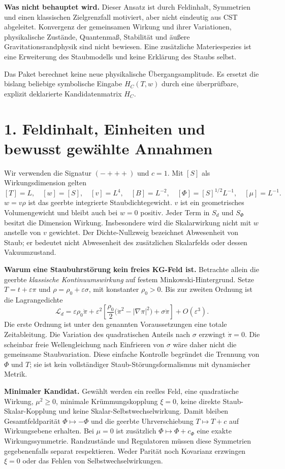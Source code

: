 \documentclass[10pt,a4paper]{article}
\newcommand{\sect}[1]{\section*{\color{navy}#1}}
\begin{document}
\textbf{Was nicht behauptet wird.} Dieser Ansatz ist durch Feldinhalt,
Symmetrien und einen klassischen Zielgrenzfall motiviert, aber nicht
eindeutig aus CST abgeleitet. Konvergenz der gemeinsamen Wirkung und ihrer
Variationen, physikalische Zustände, Quantenmaß, Stabilität und äußere
Gravitationsrandphysik sind nicht bewiesen. Eine zusätzliche Materiespezies
ist eine Erweiterung des Staubmodells und keine Erklärung des Staubs selbst.

Das Paket berechnet keine neue physikalische Übergangsamplitude. Es ersetzt
die bislang beliebige symbolische Eingabe $H_C(T,w)$ durch eine überprüfbare,
explizit deklarierte Kandidatenmatrix $H_C$.

\newpage
\sect{1. Feldinhalt, Einheiten und bewusst gewählte Annahmen}
Wir verwenden die Signatur $(-+++)$ und $c=1$. Mit $[S]$ als
Wirkungsdimension gelten
\[
[T]=L,\quad [w]=[S],\quad [v]=L^4,\quad [B]=L^{-2},
\quad [\Phi]=[S]^{1/2}L^{-1},\quad[\mu]=L^{-1}.
\]
$w=v\rho$ ist das geerbte integrierte Staubdichtegewicht. $v$ ist ein
geometrisches Volumengewicht und bleibt auch bei $w=0$ positiv.
Jeder Term in $S_d$ und $S_\Phi$ besitzt die Dimension Wirkung.
Insbesondere wird die Skalarwirkung nicht mit $w$ anstelle von $v$ gewichtet.
Der Dichte-Nullzweig bezeichnet Abwesenheit von Staub; er bedeutet nicht
Abwesenheit des zusätzlichen Skalarfelds oder dessen Vakuumzustand.

\textbf{Warum eine Staubuhrstörung kein freies KG-Feld ist.}
Betrachte allein die geerbte \emph{klassische Kontinuumswirkung} auf festem
Minkowski-Hintergrund. Setze $T=t+\varepsilon\pi$ und
$\rho=\rho_0+\varepsilon\sigma$, mit konstanter $\rho_0>0$. Bis zur
zweiten Ordnung ist die Lagrangedichte
\[
\mathcal L_d=
\varepsilon\rho_0\dot\pi+
\varepsilon^2\left[\frac{\rho_0}{2}
\bigl(\dot\pi^2-|\nabla\pi|^2\bigr)+\sigma\dot\pi\right]
+O(\varepsilon^3).
\]
Die erste Ordnung ist unter den genannten Voraussetzungen eine totale
Zeitableitung. Die Variation des quadratischen Anteils nach $\sigma$
erzwingt $\dot\pi=0$. Die scheinbar freie Wellengleichung nach Einfrieren
von $\sigma$ wäre daher nicht die gemeinsame Staubvariation.
Diese einfache Kontrolle begründet die Trennung von $\Phi$ und $T$;
sie ist kein vollständiger Staub-Störungsformalismus mit dynamischer Metrik.

\textbf{Minimaler Kandidat.} Gewählt werden ein reelles Feld, eine
quadratische Wirkung, $\mu^2\geq0$, minimale Krümmungskopplung $\xi=0$,
keine direkte Staub-Skalar-Kopplung und keine Skalar-Selbstwechselwirkung.
Damit bleiben Gesamtfeldparität $\Phi\mapsto-\Phi$ und die geerbte
Uhrverschiebung $T\mapsto T+c$ auf Wirkungsebene erhalten. Bei $\mu=0$
ist zusätzlich $\Phi\mapsto\Phi+c_\Phi$ eine exakte Wirkungssymmetrie.
Randzustände und Regulatoren müssen diese Symmetrien gegebenenfalls separat
respektieren. Weder Parität noch Kovarianz erzwingen $\xi=0$ oder das
Fehlen von Selbstwechselwirkungen.
\end{document}
